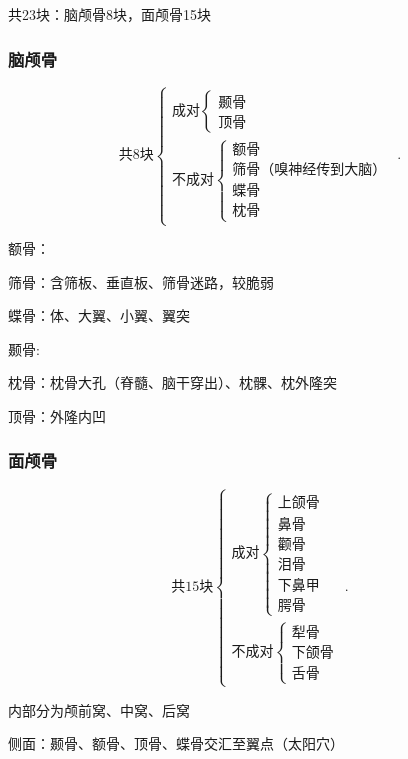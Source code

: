 共23块：脑颅骨8块，面颅骨15块

\subsubsection{脑颅骨}%
\label{subsub:脑颅骨}
\[
    \mbox{共8块}
    \begin{cases}
        \mbox{成对}
        \begin{cases}
            \mbox{颞骨}\\ 
            \mbox{顶骨}
        \end{cases}\\
        \mbox{不成对}
        \begin{cases}
            \mbox{额骨}\\ 
            \mbox{筛骨（嗅神经传到大脑）}\\ 
            \mbox{蝶骨}\\ 
            \mbox{枕骨}
        \end{cases}
    \end{cases}
.\] 
\begin{notation}
    额骨：
\end{notation}

\begin{notation}
    筛骨：含筛板、垂直板、筛骨迷路，较脆弱
\end{notation}

\begin{notation}
    蝶骨：体、大翼、小翼、翼突
\end{notation}

\begin{notation}
    颞骨:
\end{notation}

\begin{notation}
    枕骨：枕骨大孔（脊髓、脑干穿出）、枕髁、枕外隆突

    顶骨：外隆内凹
\end{notation}

\subsubsection{面颅骨}%
\label{subsub:面颅骨}
\[
    \mbox{共15块}
    \begin{cases}
        \mbox{成对}
        \begin{cases}
            \mbox{上颌骨}\\ 
            \mbox{鼻骨}\\ 
            \mbox{颧骨}\\ 
            \mbox{泪骨}\\ 
            \mbox{下鼻甲}\\ 
            \mbox{腭骨}
        \end{cases}\\
        \mbox{不成对}
        \begin{cases}
            \mbox{犁骨}\\ 
            \mbox{下颌骨}\\ 
            \mbox{舌骨}
        \end{cases}
    \end{cases}
.\] 

内部分为颅前窝、中窝、后窝

侧面：颞骨、额骨、顶骨、蝶骨交汇至翼点（太阳穴）
